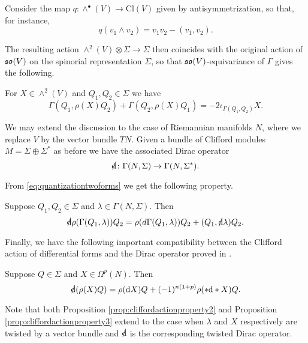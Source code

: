 \documentclass[10pt, oneside]{article}
\newcommand{\Cl}{\mathrm{Cl}}
\begin{document}
Consider the map $q\colon \wedge^\bullet(V)\rightarrow \Cl(V)$ given by antisymmetrization, so that, for instance,
\begin{equation}
q(v_1\wedge v_2) = v_1v_2 - (v_1, v_2).
\label{eq:quantizationtwoforms}
\end{equation}

The resulting action $\wedge^2(V)\otimes \Sigma\rightarrow \Sigma$ then coincides with the original action of $\mathfrak{so}(V)$ on the spinorial representation $\Sigma$, so that $\mathfrak{so}(V)$-equivariance of $\Gamma$ gives the following.

\begin{prop}
For $X\in\wedge^2(V)$ and $Q_1,Q_2\in\Sigma$ we have
\[\Gamma(Q_1, \rho(X) Q_2) + \Gamma(Q_2, \rho(X) Q_1) = -2\iota_{\Gamma(Q_1, Q_2)} X.\]
\label{prop:cliffordactionproperty1}
\end{prop}

We may extend the discussion to the case of Riemannian manifolds $N$, where we replace $V$ by the vector bundle $TN$. Given a bundle of Clifford modules $M=\Sigma\oplus \Sigma^*$ as before we have the associated Dirac operator
\[\sd{\d}\colon \Gamma(N, \Sigma)\rightarrow \Gamma(N, \Sigma^*).\]

From \eqref{eq:quantizationtwoforms} we get the following property.

\begin{prop}
Suppose $Q_1,Q_2\in\Sigma$ and $\lambda\in\Gamma(N, \Sigma)$. Then
\[\sd{\d}\rho(\Gamma(Q_1, \lambda)) Q_2 = \rho(d \Gamma(Q_1, \lambda)) Q_2 + (Q_1, \sd{\d} \lambda) Q_2.\]
\label{prop:cliffordactionproperty2}
\end{prop}

Finally, we have the following important compatibility between the Clifford action of differential forms and the Dirac operator proved in \cite[equation 7.6]{Snygg}.

\begin{prop}
Suppose $Q\in\Sigma$ and $X\in\Omega^p(N)$. Then
\[\sd{\d}(\rho(X) Q) = \rho(\d X)Q + (-1)^{n(1+p)}\rho(\ast \d\ast X) Q.\]
\label{prop:cliffordactionproperty3}
\end{prop}

Note that both Proposition \ref{prop:cliffordactionproperty2} and Proposition \ref{prop:cliffordactionproperty3} extend to the case when $\lambda$ and $X$ respectively are twisted by a vector bundle and $\sd{\d}$ is the corresponding twisted Dirac operator.

\pagestyle{bib}
\printbibliography
\end{document}
